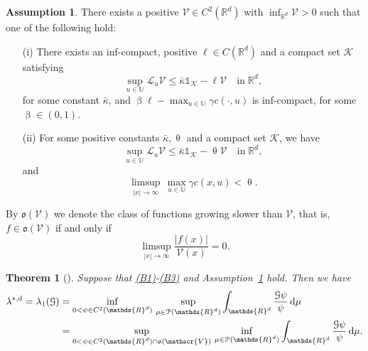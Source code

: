 \documentclass[notitlepage,11pt,reqno]{amsart}
\numberwithin{equation}{section}
\theoremstyle{plain}
\newtheorem{theorem}{Theorem}[section]
\theoremstyle{definition}
\newtheorem{assumption}{Assumption}[section]
\theoremstyle{remark}
\newcommand{\Ind}{\mathds{1}}       %
\newcommand{\Act}{{\mathds{U}}}
\newcommand{\cG}{{\mathcal{G}}}     %
\newcommand{\cK}{{\mathcal{K}}}
\newcommand{\sL}{{\mathscr{L}}}
\newcommand{\Pm}{{\mathcal{P}}}     %
\newcommand{\Lyap}{{\mathscr{V}}}   %
\newcommand{\lamstrdf}{\lambda^{*,{\rm d}}}
\newcommand{\Rd}{{\mathds{R}^{d}}}
\newcommand{\D}{\mathrm{d}} %
\newcommand{\sorder}{{\mathfrak{o}}} %
\begin{document}
\begin{assumption}\label{A3.2}
There exists a positive $\Lyap\in C^2(\Rd)$ with $\inf_{\Rd}\Lyap>0$
such that one of the following hold:
\begin{itemize}
\item[(i)] There exists an inf-compact, positive $\ell\in C(\Rd)$ and
a compact set $\cK$ satisfying
\begin{equation*}
\sup_{u\in\Act}\sL_u \Lyap \leq \bar\kappa \Ind_\cK -\ell \Lyap
\quad \text{in}\; \Rd,
\end{equation*}
for some constant $\bar\kappa$, and 
$\upbeta\ell-\max_{u\in\Act} \gamma c(\cdot, u)$
is inf-compact, for some $\upbeta\in (0, 1)$.
\item[(ii)] For some positive constants $\bar\kappa, \uptheta$
and a compact set $\cK$,
we have
\begin{equation*}
\sup_{u\in\Act}\sL_u \Lyap \leq \bar\kappa \Ind_\cK -\uptheta \Lyap
\quad \text{in}\; \Rd,
\end{equation*}
and
$$\limsup_{|x|\to\infty}\, \max_{u\in\Act}\gamma c(x, u)<\uptheta.$$
\end{itemize}
\end{assumption}
By $\sorder(\Lyap)$ we denote the class of functions growing slower than
$\Lyap$, that is, $f\in\sorder(\Lyap)$ if and only if
$$\limsup_{|x|\to\infty} \frac{|f(x)|}{\Lyap(x)}=0.$$

\begin{theorem}[\cite{MR4048004}]
Suppose that \hyperlink{B1}{(B1)}-\hyperlink{B3}{(B3)} and
Assumption~\ref{A3.2} hold. Then we have
\begin{align*}
\lamstrdf=\lambda_1(\cG)&=\inf_{0<\psi\in C^2(\Rd)}\, 
\sup_{\mu\in\Pm(\Rd)}\int_{\Rd}\frac{\cG\psi}{\psi}\, \D\mu
\\
&= \sup_{0<\psi\in C^2(\Rd)\cap\sorder(\Lyap)}\, 
\inf_{\mu\in\Pm(\Rd)}\int_{\Rd}\frac{\cG\psi}{\psi}\, \D\mu.
\end{align*}
\end{theorem}
\end{document}
